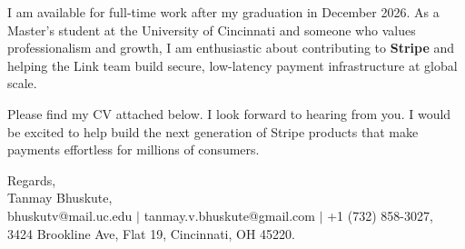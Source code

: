 \documentclass[11pt]{letter}
\begin{document}
\begin{letter}{}
I am available for full-time work after my graduation in December 2026. As a Master's student at the University of Cincinnati and someone who values professionalism and growth, I am enthusiastic about contributing to \textbf{Stripe} and helping the Link team build secure, low-latency payment infrastructure at global scale.

Please find my CV attached below. I look forward to hearing from you. I would be excited to help build the next generation of Stripe products that make payments effortless for millions of consumers.

{\setlength{\parskip}{0pt}
Regards,\\
Tanmay Bhuskute,\\
bhuskutv@mail.uc.edu $\mid$ tanmay.v.bhuskute@gmail.com $\mid$ +1 (732) 858-3027,\\
3424 Brookline Ave, Flat 19, Cincinnati, OH 45220.
}

\end{letter}
\end{document}
